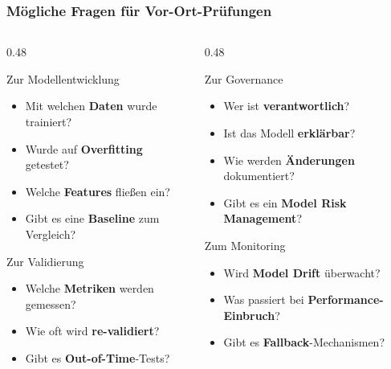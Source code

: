 \documentclass[11pt, aspectratio=169]{beamer}
\begin{document}
\begin{frame}
    \frametitle{Mögliche Fragen für Vor-Ort-Prüfungen}
    \begin{columns}[t]
        \begin{column}{0.48\textwidth}
            \begin{block}{Zur Modellentwicklung}
                \begin{itemize}
                    \item Mit welchen \textbf{Daten} wurde trainiert?
                    \item Wurde auf \textbf{Overfitting} getestet?
                    \item Welche \textbf{Features} fließen ein?
                    \item Gibt es eine \textbf{Baseline} zum Vergleich?
                \end{itemize}
            \end{block}
            \vspace{0.2cm}
            \begin{block}{Zur Validierung}
                \begin{itemize}
                    \item Welche \textbf{Metriken} werden gemessen?
                    \item Wie oft wird \textbf{re-validiert}?
                    \item Gibt es \textbf{Out-of-Time}-Tests?
                \end{itemize}
            \end{block}
        \end{column}
        \begin{column}{0.48\textwidth}
            \begin{block}{Zur Governance}
                \begin{itemize}
                    \item Wer ist \textbf{verantwortlich}?
                    \item Ist das Modell \textbf{erklärbar}?
                    \item Wie werden \textbf{Änderungen} dokumentiert?
                    \item Gibt es ein \textbf{Model Risk Management}?
                \end{itemize}
            \end{block}
            \vspace{0.2cm}
            \begin{block}{Zum Monitoring}
                \begin{itemize}
                    \item Wird \textbf{Model Drift} überwacht?
                    \item Was passiert bei \textbf{Performance-Einbruch}?
                    \item Gibt es \textbf{Fallback}-Mechanismen?
                \end{itemize}
            \end{block}
        \end{column}
    \end{columns}
\end{frame}
\end{document}
